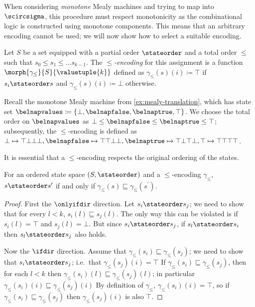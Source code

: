 \begin{example}
\end{example}

When considering \emph{monotone} Mealy machines and trying to map into
\(\scircsigma\), this procedure must respect monotonicity as the combinational
logic is constructed using monotone components.
This means that an arbitrary encoding cannot be used; we will now show how to
select a suitable encoding.

\begin{definition}[Encoding]\label{def:encoding}
    Let \(S\) be a set equipped with a partial order \(\stateorder\) and a total
    order \(\leq\) such that \(s_0 \leq s_1 \leq \dots s_{k-1}\).
    The \emph{\(\leq\)-encoding} for this assignment is a function
    \(\morph{\gamma_\leq}{S}{\valuetuple{k}}\) defined as
    \(\gamma_\leq(s)(i) \coloneqq \top\) if \(s_i \stateorder s\) and
    \(\gamma_\leq(s)(i) \coloneqq \bot\) otherwise.
\end{definition}

\begin{example}
    Recall the monotone Mealy machine from \cref{ex:mealy-translation}, which
    has state set \(
        \belnapvalues \coloneqq \{\bot,\belnapfalse,\belnaptrue,\top\}
    \).
    We choose the total order on \(\belnapvalues\) as
    \(\bot \leq \belnapfalse \leq \belnaptrue \leq \top\); subsequently, the
    \(\leq\)-encoding is defined as \(
        \bot \mapsto \top\bot\bot\bot, \belnapfalse \mapsto \top\top\bot\bot,
        \belnaptrue \mapsto \top\bot\top\bot, \top \mapsto \top\top\top\top
    \).
\end{example}

It is essential that a \(\leq\)-encoding respects the original ordering of the
states.

\begin{lemma}
    For an ordered state space \((S,\stateorder)\) and a \(\leq\)-encoding
    \(\gamma_\leq\), \(s \stateorder s^\prime\) if and only if
    \(\gamma_\leq(s) \sqsubseteq \gamma_\leq(s^\prime)\).
\end{lemma}
\begin{proof}
    First the \(\onlyifdir\) direction.
    Let \(s_i \stateorder s_j\); we need to show that for every \(l < k\),
    \(s_i(l) \sqsubseteq s_j(l)\).
    The only way this can be violated is if \(s_i(l) = \top\) and
    \(s_j(l) = \bot\).
    But since \(s_i \stateorder s_j\), if \(s_l \stateorder s_i\) then
    \(s_l \stateorder s_j\) also holds.

    Now the \(\ifdir\) direction.
    Assume that \(\gamma_\leq(s_i) \sqsubseteq \gamma_\leq(s_j)\); we need to
    show that \(s_i \stateorder s_j\); i.e.\ that \(\gamma_\leq(s_j)(i) = \top\)
    If \(\gamma_\leq(s_i) \sqsubseteq \gamma_\leq(s_j)\), then for each
    \(l < k\) then \(\gamma_\leq(s_i)(l) \sqsubseteq \gamma_\leq(s_j)(l)\);
    in particular \(\gamma_\leq(s_i)(i) \sqsubseteq \gamma_\leq(s_j)(i)\)
    By definition of \(\gamma_\leq\), \(\gamma_\leq(s_i)(i) = \top\), so if
    \(\gamma_\leq(s_i) \sqsubseteq \gamma_\leq(s_j)\) then
    \(\gamma_\leq(s_j)(i)\) is also \(\top\).
\end{proof}

